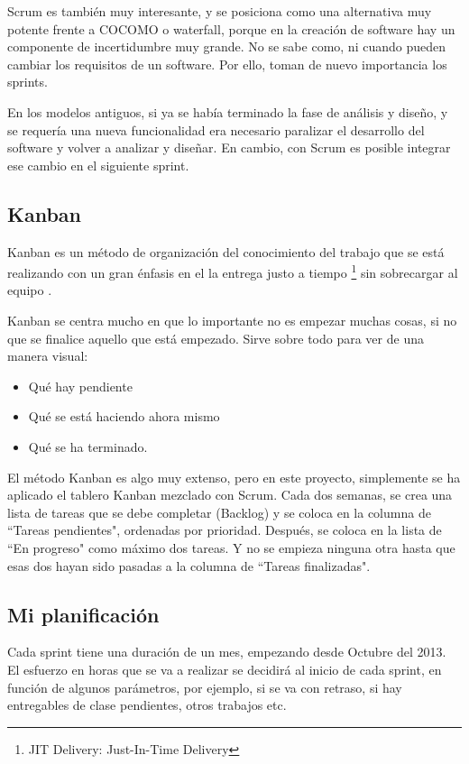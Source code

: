 Scrum es tambi\'en muy interesante, y se posiciona como una alternativa muy potente frente a 
COCOMO o waterfall, porque en la creaci\'on de software hay un componente de incertidumbre muy 
grande. No se sabe como, ni cuando pueden cambiar los requisitos de un 
software. Por ello, toman de nuevo importancia los sprints. 

En los modelos antiguos, si ya se hab\'ia terminado la fase de an\'alisis y dise\~no, y se requer\'ia una nueva funcionalidad era necesario 
paralizar el desarrollo del software y volver a analizar y diseñar. En cambio, con Scrum es 
posible integrar ese cambio en el siguiente sprint.

\subsection{Kanban}
Kanban es un m\'etodo de organizaci\'on del conocimiento del trabajo que se est\'a realizando con un gran \'enfasis en el la entrega justo a 
tiempo \footnote{JIT Delivery: Just-In-Time Delivery} sin sobrecargar al equipo \cite{Kanban:WhatIsIt}.

Kanban se centra mucho en que lo importante no es empezar muchas cosas, si no que se finalice
aquello que est\'a empezado. Sirve sobre todo 
para ver de una manera visual:
\begin{itemize}
    \item Qu\'e hay pendiente
    \item Qu\'e se est\'a haciendo ahora mismo
    \item Qu\'e se ha terminado.
\end{itemize}

El m\'{e}todo Kanban es algo muy extenso, pero en este proyecto, simplemente se ha aplicado el tablero Kanban mezclado con Scrum. 
Cada dos semanas, se crea una lista de tareas que se debe completar (Backlog) y se coloca en la columna de ``Tareas pendientes", 
ordenadas por prioridad. Despu\'es, se coloca en la lista de ``En progreso" como m\'{a}ximo dos tareas. Y no se empieza ninguna otra
 hasta que esas dos hayan sido pasadas a la columna de ``Tareas finalizadas".

\subsection{Mi planificaci\'{o}n}
Cada sprint tiene una duraci\'{o}n de un mes, empezando desde Octubre del 2013. 
El esfuerzo en horas que se va a 
realizar se decidir\'a al inicio de cada sprint, en funci\'on de algunos par\'ametros, por ejemplo, si se va con retraso,
si hay entregables de clase pendientes, otros trabajos etc. 

